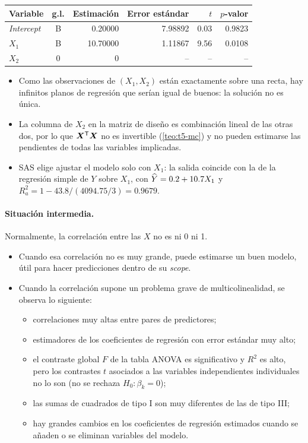 \begin{ejemplo}
\begin{center}
    \medskip
    \begin{tabular}{lcrrrr}
      \toprule
      Variable & g.l. & Estimación & Error estándar & $t$ & $p$-valor \\
      \midrule
      \emph{Intercept} & B & 0.20000 & 7.98892 & 0.03 & 0.9823 \\
      $X_1$ & B & 10.70000 & 1.11867 & 9.56 & 0.0108 \\
      $X_2$ & 0 & 0 & -- & -- & -- \\
      \bottomrule
    \end{tabular}
  \end{center}
  \begin{itemize}
    \item Como las observaciones de $(X_1,X_2)$ están exactamente sobre una recta, hay infinitos
      planos de regresión que serían igual de buenos: la solución no es única.
    \item La columna de $X_2$ en la matriz de diseño es combinación lineal de las otras dos, por
      lo que $\bm{X}^{\mathsf{T}}\bm{X}$ no es invertible (\cref{teo:t5-mc}) y no pueden estimarse las pendientes de
      todas las variables implicadas.
    \item SAS elige ajustar el modelo solo con $X_1$: la salida coincide con la de la regresión
      simple de $Y$ sobre $X_1$, con $\widehat{Y}=0.2+10.7X_1$ y $R^2_a=1-43.8/(4094.75/3)=0.9679$.
  \end{itemize}
\end{ejemplo}

\paragraph{Situación intermedia.} Normalmente, la correlación entre las $X$ no es ni 0 ni 1.
\begin{itemize}
  \item Cuando esa correlación no es muy grande, puede estimarse un buen modelo, útil para hacer
    predicciones dentro de su \emph{scope}.
  \item Cuando la correlación supone un problema grave de multicolinealidad, se observa lo
    siguiente:
    \begin{itemize}
      \item correlaciones muy altas entre pares de predictores;
      \item estimadores de los coeficientes de regresión con error estándar muy alto;
      \item el contraste global $F$ de la tabla ANOVA es significativo y $R^2$ es alto, pero los
        contrastes $t$ asociados a las variables independientes individuales no lo son (no se
        rechaza $H_0\colon\beta_k=0$);
      \item las sumas de cuadrados de tipo I son muy diferentes de las de tipo III;
      \item hay grandes cambios en los coeficientes de regresión estimados cuando se añaden o se
        eliminan variables del modelo.
    \end{itemize}
\end{itemize}


